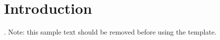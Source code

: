 \documentclass[document.tex]{subfiles}
\begin{document}
\section{Introduction}
\kant[1-2]
\autocite{BobsBook01}.
Note: this sample text should be removed before using the template.
\end{document}
